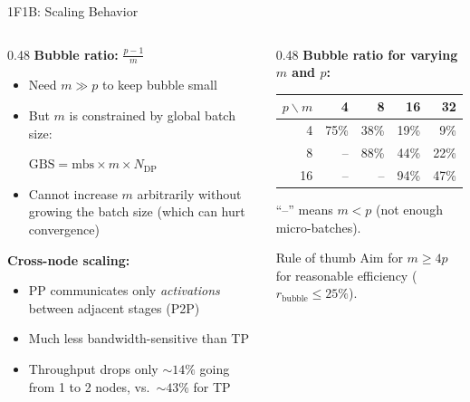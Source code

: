 \begin{frame}{1F1B: Scaling Behavior}

  \begin{columns}
    \begin{column}{0.48\textwidth}
      \textbf{Bubble ratio:} $\frac{p-1}{m}$

      \vspace{0.3em}
      \begin{itemize}
        \item Need $m \gg p$ to keep bubble small
        \item But $m$ is constrained by global batch size:\par
          $\text{GBS} = \text{mbs} \times m \times N_{\text{DP}}$
        \item Cannot increase $m$ arbitrarily without growing the batch size (which can hurt convergence)
      \end{itemize}

      \vspace{0.5em}
      \textbf{Cross-node scaling:}
      \begin{itemize}
        \item PP communicates only \emph{activations} between adjacent stages (P2P)
        \item Much less bandwidth-sensitive than TP
        \item Throughput drops only ${\sim}14\%$ going from 1 to 2 nodes, vs.\ ${\sim}43\%$ for TP~\cite{tazi2025ultrascale}
      \end{itemize}
    \end{column}
    \begin{column}{0.48\textwidth}
      \textbf{Bubble ratio for varying $m$ and $p$:}
      \vspace{0.2em}

      \begin{center}
      \begin{tabular}{r | r r r r}
        \toprule
        $p \backslash m$ & 4 & 8 & 16 & 32 \\
        \midrule
        4  & 75\% & 38\% & 19\% & 9\% \\
        8  & --   & 88\% & 44\% & 22\% \\
        16 & --   & --   & 94\% & 47\% \\
        \bottomrule
      \end{tabular}
      \end{center}

      \vspace{0.3em}
      {\small ``--'' means $m < p$ (not enough micro-batches).}

      \vspace{0.5em}
      \begin{alertblock}{Rule of thumb}
        Aim for $m \geq 4p$ for reasonable efficiency ($r_{\text{bubble}} \leq 25\%$).
      \end{alertblock}
    \end{column}
  \end{columns}
\end{frame}

